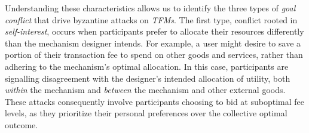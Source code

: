 % 
% 

Understanding these characteristics allows us to identify the three types of \textit{goal conflict} that drive byzantine attacks on \textit{TFMs}. The first type, conflict rooted in \textit{self-interest}, occurs when participants prefer to allocate their resources differently than the mechanism designer intends. For example, a user might desire to save a portion of their transaction fee to spend on other goods and services, rather than adhering to the mechanism's optimal allocation. In this case, participants are signalling disagreement with the designer's intended allocation of utility, both \textit{within} the mechanism and \textit{between} the mechanism and other external goods. These attacks consequently involve participants choosing to bid at suboptimal fee levels, as they prioritize their personal preferences over the collective optimal outcome.

